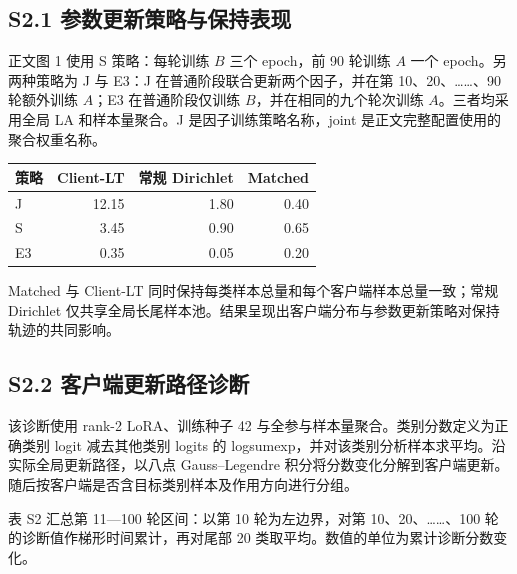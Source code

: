 \documentclass[10pt,twocolumn,letterpaper]{article}
\begin{document}
\subsection*{S2.1 参数更新策略与保持表现}

正文图 1 使用 S 策略：每轮训练 $B$ 三个 epoch，前 90 轮训练 $A$ 一个 epoch。另两种策略为 J 与 E3：J 在普通阶段联合更新两个因子，并在第 10、20、……、90 轮额外训练 $A$；E3 在普通阶段仅训练 $B$，并在相同的九个轮次训练 $A$。三者均采用全局 LA 和样本量聚合。J 是因子训练策略名称，joint 是正文完整配置使用的聚合权重名称。


\par\medskip\noindent\begin{minipage}{\columnwidth}\centering{}\small\setlength{\tabcolsep}{3pt}

\begin{tabularx}{\columnwidth}{Xrrr}\toprule 策略 & Client-LT & 常规 Dirichlet & Matched \\\midrule

J & 12.15 & 1.80 & 0.40 \\

S & 3.45 & 0.90 & 0.65 \\

E3 & 0.35 & 0.05 & 0.20 \\

\bottomrule\end{tabularx}\end{minipage}\par\medskip

Matched 与 Client-LT 同时保持每类样本总量和每个客户端样本总量一致；常规 Dirichlet 仅共享全局长尾样本池。结果呈现出客户端分布与参数更新策略对保持轨迹的共同影响。


\subsection*{S2.2 客户端更新路径诊断}

该诊断使用 rank-2 LoRA、训练种子 42 与全参与样本量聚合。类别分数定义为正确类别 logit 减去其他类别 logits 的 logsumexp，并对该类别分析样本求平均。沿实际全局更新路径，以八点 Gauss–Legendre 积分将分数变化分解到客户端更新。随后按客户端是否含目标类别样本及作用方向进行分组。


表 S2 汇总第 11—100 轮区间：以第 10 轮为左边界，对第 10、20、……、100 轮的诊断值作梯形时间累计，再对尾部 20 类取平均。数值的单位为累计诊断分数变化。
\end{document}
